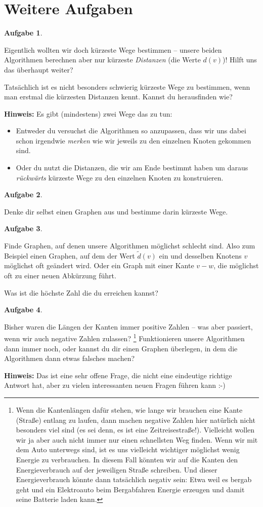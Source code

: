 \documentclass[a4paper,ngerman,12pt]{scrartcl}
\theoremstyle{definition}
\newtheorem{aufg}{Aufgabe}
\newenvironment{aufgabe}[1][]
		{\begin{shaded}\vspace{-0.3cm}\begin{aufg}\emph{#1} \par\medskip}
		{\end{aufg}\vspace{-0.3cm}\end{shaded}}
\theoremstyle{plain}
\theoremstyle{remark}
\newcommand{\kante}[2]{#1{-}#2}
\begin{document}
\section{Weitere Aufgaben}

\begin{aufgabe}
	Eigentlich wollten wir doch kürzeste Wege bestimmen -- unsere beiden Algorithmen berechnen aber nur kürzeste \emph{Distanzen} (die Werte $d(v)$)! Hilft uns das überhaupt weiter?
	
	Tatsächlich ist es nicht besonders schwierig kürzeste Wege zu bestimmen, wenn man erstmal die kürzesten Distanzen kennt. Kannst du herausfinden wie?
	
	\textbf{Hinweis:} Es gibt (mindestens) zwei Wege das zu tun:
	\begin{itemize}
		\item Entweder du versuchst die Algorithmen so anzupassen, dass wir uns dabei schon irgendwie \emph{merken} wie wir jeweils zu den einzelnen Knoten gekommen sind.
		\item Oder du nutzt die Distanzen, die wir am Ende bestimmt haben um daraus \emph{rückwärts} kürzeste Wege zu den einzelnen Knoten zu konstruieren.
	\end{itemize}
\end{aufgabe}

\begin{aufgabe}
	Denke dir selbst einen Graphen aus und bestimme darin kürzeste Wege.
\end{aufgabe}

\begin{aufgabe}
	Finde Graphen, auf denen unsere Algorithmen möglichst schlecht sind. Also zum Beispiel einen Graphen, auf dem der Wert $\tilde{d}(v)$ ein und desselben Knotens $v$ möglichst oft geändert wird. Oder ein Graph mit einer Kante $\kante{v}{w}$, die möglichst oft zu einer neuen Abkürzung führt.
	
	Was ist die höchste Zahl die du erreichen kannst?
\end{aufgabe}

\begin{aufgabe}
	Bisher waren die Längen der Kanten immer positive Zahlen -- was aber passiert, wenn wir auch negative Zahlen zulassen?
	\footnote{Wenn die Kantenlängen dafür stehen, wie lange wir brauchen eine Kante (Straße) entlang zu laufen, dann machen negative Zahlen hier natürlich nicht besonders viel sind (es sei denn, es ist eine Zeitreisestraße!). Vielleicht wollen wir ja aber auch nicht immer nur einen schnellsten Weg finden. Wenn wir mit dem Auto unterwegs sind, ist es uns vielleicht wichtiger möglichst wenig Energie zu verbrauchen. In diesem Fall könnten wir auf die Kanten den Energieverbrauch auf der jeweiligen Straße schreiben. Und dieser Energieverbrauch könnte dann tatsächlich negativ sein: Etwa weil es bergab geht und ein Elektroauto beim Bergabfahren Energie erzeugen und damit seine Batterie laden kann.}
	Funktionieren unsere Algorithmen dann immer noch, oder kannst du dir einen Graphen überlegen, in dem die Algorithmen dann etwas falsches machen?
	
	\textbf{Hinweis:} Das ist eine sehr offene Frage, die nicht eine eindeutige richtige Antwort hat, aber zu vielen interessanten neuen Fragen führen kann :-)
\end{aufgabe}
\end{document}
